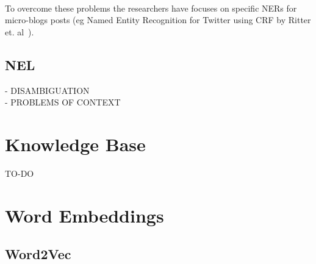 \paragraph{}
To overcome these problems the researchers have focuses on specific NERs for micro-blogs posts (eg Named Entity Recognition for Twitter using CRF by Ritter et. al~\cite{ritter2011named}).
\subsection{NEL}
- DISAMBIGUATION\\
- PROBLEMS OF CONTEXT
\section{Knowledge Base}
TO-DO

\section{Word Embeddings}
\subsection{Word2Vec}